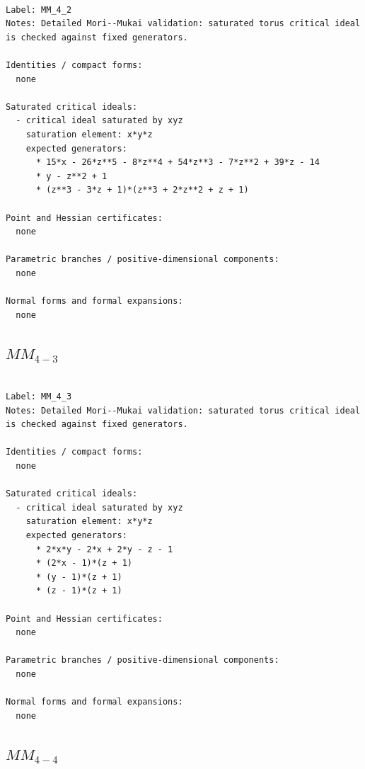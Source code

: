 \documentclass[10pt,a4paper]{article}
\begin{document}
\begin{lstlisting}

Label: MM_4_2
Notes: Detailed Mori--Mukai validation: saturated torus critical ideal is checked against fixed generators.

Identities / compact forms:
  none

Saturated critical ideals:
  - critical ideal saturated by xyz
    saturation element: x*y*z
    expected generators:
      * 15*x - 26*z**5 - 8*z**4 + 54*z**3 - 7*z**2 + 39*z - 14
      * y - z**2 + 1
      * (z**3 - 3*z + 1)*(z**3 + 2*z**2 + z + 1)

Point and Hessian certificates:
  none

Parametric branches / positive-dimensional components:
  none

Normal forms and formal expansions:
  none

\end{lstlisting}

\subsection*{$ MM_{4-3} $}

\begin{lstlisting}

Label: MM_4_3
Notes: Detailed Mori--Mukai validation: saturated torus critical ideal is checked against fixed generators.

Identities / compact forms:
  none

Saturated critical ideals:
  - critical ideal saturated by xyz
    saturation element: x*y*z
    expected generators:
      * 2*x*y - 2*x + 2*y - z - 1
      * (2*x - 1)*(z + 1)
      * (y - 1)*(z + 1)
      * (z - 1)*(z + 1)

Point and Hessian certificates:
  none

Parametric branches / positive-dimensional components:
  none

Normal forms and formal expansions:
  none

\end{lstlisting}

\subsection*{$ MM_{4-4} $}
\end{document}

